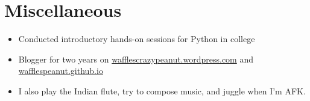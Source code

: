 \documentclass[11pt,a4paper,sans]{moderncv}        %
\newcommand\chref[3][linky]{\href{#2}{\color{#1}#3}}
\begin{document}
\section{Miscellaneous}
\begin{itemize}
\item Conducted introductory hands-on sessions for Python in college
\item Blogger for two years on \chref{https://wafflescrazypeanut.wordpress.com/}{wafflescrazypeanut.wordpress.com} and \chref{https://wafflespeanut.github.io/}{wafflespeanut.github.io}
\item I also play the Indian flute, try to compose music, and juggle when I'm AFK.
\end{itemize}



\end{document}
